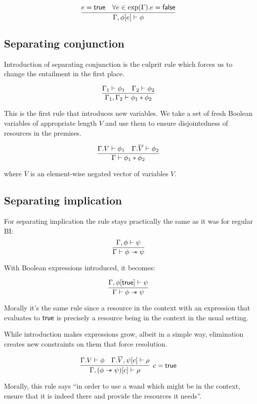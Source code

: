 \[\infer{\Gamma, \phi[e] \vdash \phi}
      {e = \true &
       \forall e \in \expr(\Gamma). e = \false}\]


\subsection{Separating conjunction}

Introduction of separating conjunction is the culprit rule which forces us to change the entailment in the first place.

\[\infer{\Gamma_1, \Gamma_2 \vdash \phi_1 \ast \phi_2}
        {\Gamma_1 \vdash \phi_1 &
         \Gamma_2 \vdash \phi_2}\]

This is the first rule that introduces new variables.
We take a set of fresh Boolean variables of appropriate length \(V\) and use them to ensure disjointedness of resources in the premises.

\[\infer{\Gamma \vdash \phi_1 \ast \phi_2}
        {\Gamma. V \vdash \phi_1 &
         \Gamma. \overline{V} \vdash \phi_2}\]

where \(\overline{V}\) is an element-wise negated vector of variables \(V\).

\subsection{Separating implication}
\label{sec:separating-impl-bi-with-constr}


For separating implication the rule stays practically the same as it was for regular BI:
\[
\infer{\Gamma \vdash \phi \wand \psi}
      {\Gamma , \phi \vdash \psi}
\]

With Boolean expressions introduced, it becomes:

\[
\infer{\Gamma \vdash \phi \wand \psi}
      {\Gamma , \phi[\true] \vdash \psi}
\]

Morally it's the same rule since a resource in the context with an expression that evaluates to \(\textsf{true}\) is precisely a resource being in the context in the usual setting.

While introduction makes expressions grow, albeit in a simple way, elimination creates new constraints on them that force resolution.

\[
\infer[ c = \true ]
      {\Gamma, (\phi \wand \psi)[c] \vdash \rho}
      {\Gamma. V \vdash \phi &
       \Gamma. \overline{V}, \psi[c] \vdash \rho}
\]

Morally, this rule says ``in order to use a wand which might be in the context, ensure that it is indeed there and provide the resources it needs''.

